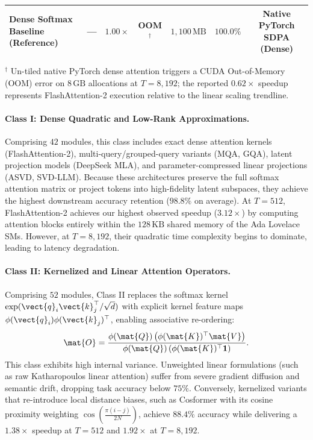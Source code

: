 \begin{table}[t]
{\begin{tabular}{l c c c c c c}
\midrule
\textbf{Dense Softmax Baseline (Reference)}    & —    & $1.00\times$ & OOM$^\dagger$        & $1{,}100\,\text{MB}$ & $100.0\%$       & Native PyTorch SDPA (Dense) \\
\bottomrule
\end{tabular}}
\par\vspace{3pt}
\raggedright\scriptsize
$^\dagger$ Un-tiled native PyTorch dense attention triggers a CUDA Out-of-Memory (OOM) error on $8\,\text{GB}$ allocations at $T=8{,}192$; the reported $0.62\times$ speedup represents FlashAttention-2 execution relative to the linear scaling trendline.
\end{table}

\paragraph{Class I: Dense Quadratic and Low-Rank Approximations.}
Comprising $42$ modules, this class includes exact dense attention kernels (FlashAttention-2), multi-query/grouped-query variants (MQA, GQA), latent projection models (DeepSeek MLA), and parameter-compressed linear projections (ASVD, SVD-LLM). Because these architectures preserve the full softmax attention matrix or project tokens into high-fidelity latent subspaces, they achieve the highest downstream accuracy retention ($98.8\%$ on average). At $T=512$, FlashAttention-2 achieves our highest observed speedup ($3.12\times$) by computing attention blocks entirely within the $128\,\text{KB}$ shared memory of the Ada Lovelace SMs. However, at $T=8{,}192$, their quadratic time complexity begins to dominate, leading to latency degradation.

\paragraph{Class II: Kernelized and Linear Attention Operators.}
Comprising $52$ modules, Class II replaces the softmax kernel $\exp(\vect{q}_i \vect{k}_j^\top / \sqrt{d})$ with explicit kernel feature maps $\phi(\vect{q}_i) \phi(\vect{k}_j)^\top$, enabling associative re-ordering:
\begin{equation}
\label{eq:class2_associative}
\mat{O} = \frac{\phi(\mat{Q}) \left(\phi(\mat{K})^\top \mat{V}\right)}{\phi(\mat{Q}) \left(\phi(\mat{K})^\top \mathbf{1}\right)}.
\end{equation}
This class exhibits high internal variance. Unweighted linear formulations (such as raw Katharopoulos linear attention) suffer from severe gradient diffusion and semantic drift, dropping task accuracy below $75\%$. Conversely, kernelized variants that re-introduce local distance biases, such as Cosformer with its cosine proximity weighting $\cos(\frac{\pi(i-j)}{2N})$, achieve $88.4\%$ accuracy while delivering a $1.38\times$ speedup at $T=512$ and $1.92\times$ at $T=8{,}192$.

